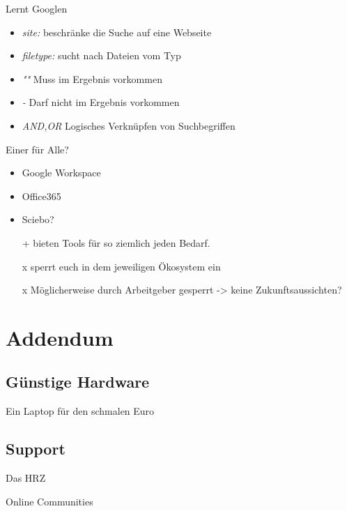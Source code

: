 \documentclass[aspectratio=169]{beamer}
\begin{document}
\begin{frame}{Lernt Googlen}
    \begin{itemize}
        \item \textit{site:} beschränke die Suche auf eine Webseite
        \item \textit{filetype:} sucht nach Dateien vom Typ
        \item \textit{""}  Muss im Ergebnis vorkommen
        \item \textit{-} Darf nicht im Ergebnis vorkommen
        \item \textit{AND,OR} Logisches Verknüpfen von Suchbegriffen
    \end{itemize}
\end{frame}
\begin{frame}{Einer für Alle?}
    \begin{itemize}
        \item Google Workspace
        \item Office365
        \item Sciebo?
    \end{itemize}
    
    \begin{itemize}
        \item[+] bieten Tools für so ziemlich jeden Bedarf.
        \item[x] sperrt euch in dem jeweiligen Ökosystem ein
        \item[x] Möglicherweise durch Arbeitgeber gesperrt -> keine Zukunftsaussichten?
    \end{itemize}  
\end{frame}
\section{Addendum}
\subsection{Günstige Hardware}
\begin{frame}{Ein Laptop für den schmalen Euro}
    
\end{frame}
\subsection{Support}
\begin{frame}{Das HRZ}
    
\end{frame}
\begin{frame}{Online Communities}
    
\end{frame}
\end{document}
